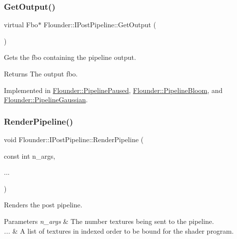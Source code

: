 \subsubsection{\texorpdfstring{Get\+Output()}{GetOutput()}}
{\footnotesize\ttfamily virtual Fbo$\ast$ Flounder\+::\+I\+Post\+Pipeline\+::\+Get\+Output (\begin{DoxyParamCaption}{ }\end{DoxyParamCaption})\hspace{0.3cm}{\ttfamily [pure virtual]}}



Gets the fbo containing the pipeline output. 

\begin{DoxyReturn}{Returns}
The output fbo. 
\end{DoxyReturn}


Implemented in \hyperlink{class_flounder_1_1_pipeline_paused_aec5ab7753183681ed2d97d9f6b4781ef}{Flounder\+::\+Pipeline\+Paused}, \hyperlink{class_flounder_1_1_pipeline_bloom_af1ee24a22c9c28e3f9a66df542a943ee}{Flounder\+::\+Pipeline\+Bloom}, and \hyperlink{class_flounder_1_1_pipeline_gaussian_aafe2b02eac20f2d16dede6df39c21864}{Flounder\+::\+Pipeline\+Gaussian}.

\mbox{\label{class_flounder_1_1_i_post_pipeline_a6a36137fbabb88ee24c274d1a523a24b}} 
\subsubsection{\texorpdfstring{Render\+Pipeline()}{RenderPipeline()}\hspace{0.1cm}{\footnotesize\ttfamily [1/2]}}
{\footnotesize\ttfamily void Flounder\+::\+I\+Post\+Pipeline\+::\+Render\+Pipeline (\begin{DoxyParamCaption}\item[{const int}]{n\+\_\+args,  }\item[{}]{... }\end{DoxyParamCaption})}



Renders the post pipeline. 


\begin{DoxyParams}{Parameters}
{\em n\+\_\+args} & The number textures being sent to the pipeline. \\
\hline
{\em ...} & A list of textures in indexed order to be bound for the shader program. \\
\hline
\end{DoxyParams}
\mbox{\label{class_flounder_1_1_i_post_pipeline_ad5388fe41486385c55896bdd9439bf60}} 
